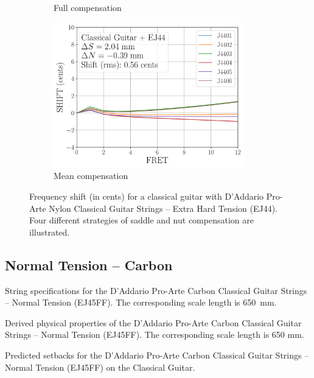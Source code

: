 \begin{figure}
\begin{subfigure}[b]{0.45\textwidth}
   \caption{Full compensation}
   \label{fig:shift_classicalguitar_ej44_full}
  \end{subfigure}
  \hspace{0.25in}
  \begin{subfigure}[b]{0.45\textwidth}
   \centering
   \includegraphics[width=3.25in]{../figures/shift_classicalguitar_ej44_mean}
   \caption{Mean compensation}
   \label{fig:shift_classicalguitar_ej44_mean}
  \end{subfigure}
  \caption{\label{fig:compensation_classicalguitar_ej44} Frequency shift (in cents) for a classical guitar with D'Addario Pro-Arte Nylon Classical Guitar Strings -- Extra Hard Tension (EJ44). Four different strategies of saddle and nut compensation are illustrated.}
 \end{figure}

 \newpage
 \subsection{Normal Tension -- Carbon}
 
 \begin{table}[htbp]
   \centering
   \caption{\label{tbl:ej45ff_mks} String specifications for the D'Addario Pro-Arte Carbon Classical Guitar Strings -- Normal Tension (EJ45FF). The corresponding scale length is 650~mm.}
   
 \end{table}%
 
 \begin{table}[htbp]
   \centering
   \caption{\label{tbl:ej45ff_props} Derived physical properties of the D'Addario Pro-Arte Carbon Classical Guitar Strings -- Normal Tension (EJ45FF). The corresponding scale length is 650 mm.}
   
 \end{table}%
 
 \begin{table}[htbp]
   \centering
   \caption{\label{tbl:ej45ff_setbacks} Predicted setbacks for the D'Addario Pro-Arte Carbon Classical Guitar Strings -- Normal Tension (EJ45FF) on the Classical Guitar.}
   
 \end{table}%
 
